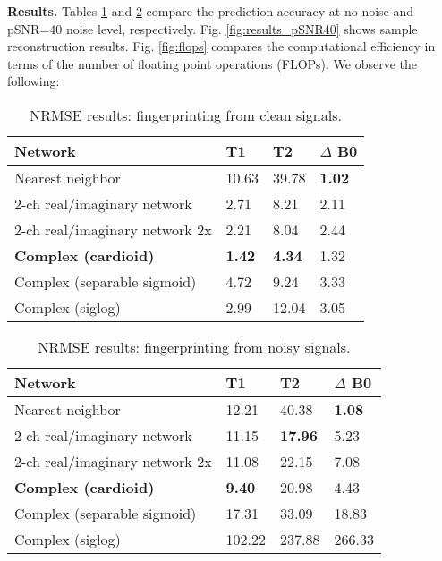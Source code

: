 \documentclass{article}
\begin{document}
{\bf Results.} 
%
Tables \ref{tab:results_clean} and \ref{tab:results_pSNR40} compare the prediction accuracy at no noise and pSNR=40 noise level, respectively.  
Fig. \ref{fig:results_pSNR40} shows sample reconstruction results. Fig. \ref{fig:flops} compares the computational efficiency  in terms of the number of floating point operations (FLOPs). We observe the following:

\begin{table}[t]
\caption{NRMSE results: fingerprinting from clean signals.}
\label{table:results}
\begin{tabular}{p{4.5cm}p{0.8cm}p{0.8cm}p{0.8cm}}
\toprule
\textbf{Network} & \textbf{T1} & \textbf{T2} & \textbf{$\Delta$ B0} \\
\midrule
Nearest neighbor & 10.63 & 39.78 & \textbf{1.02} \\
2-ch real/imaginary network & 2.71 & 8.21 & 2.11 \\
2-ch real/imaginary network 2x & 2.21 & 8.04 & 2.44 \\
\textbf{Complex (cardioid)} & \textbf{1.42} & \textbf{4.34} & 1.32 \\
Complex (separable sigmoid) & 4.72 & 9.24 & 3.33 \\
Complex (siglog) & 2.99 & 12.04 & 3.05 \\
\bottomrule
\end{tabular}
\label{tab:results_clean}
\end{table}

\begin{table}[t]
\caption{NRMSE results: fingerprinting from noisy signals.}
\label{table:results}
\begin{tabular}{p{4.5cm}p{0.8cm}p{0.8cm}p{0.8cm}}
\toprule
\textbf{Network} & \textbf{T1} & \textbf{T2} & \textbf{$\Delta$ B0} \\
\midrule
Nearest neighbor & 12.21 & 40.38 & \textbf{1.08} \\
2-ch real/imaginary network & 11.15 & \textbf{17.96} & 5.23 \\
2-ch real/imaginary network 2x & 11.08 & 22.15 & 7.08 \\
\textbf{Complex (cardioid)} & \textbf{9.40} & 20.98 & 4.43 \\
Complex (separable sigmoid) & 17.31 & 33.09 & 18.83 \\
Complex (siglog) & 102.22 & 237.88 & 266.33 \\
\bottomrule
\end{tabular}
\label{tab:results_pSNR40}
\end{table}
\end{document}
